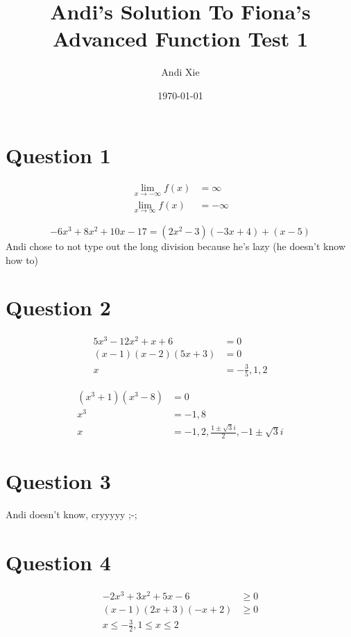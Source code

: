 \documentclass{article}
\title{Andi's Solution To Fiona's Advanced Function Test 1}
\author{Andi Xie}
\date{\today}
\begin{document}
\maketitle
\tableofcontents
\newpage


\section{Question 1}
\begin{custom-big}[Part a]
\begin{align*}
    \lim_{x\to -\infty}f(x)&=\infty\\
    \lim_{x\to \infty}f(x)&=-\infty
\end{align*}
\end{custom-big}




\begin{custom-big}[Part b]
\[
-6x^3+8x^2+10x-17=(2x^2-3)(-3x+4)+(x-5)
\]
Andi chose to not type out the long division because he's lazy (he doesn't know how to)
\end{custom-big}




\section{Question 2}
\begin{custom-big}[Part a]
\begin{align*}
5x^3-12x^2+x+6&=0\\
(x-1)(x-2)(5x+3)&=0\\
x&=-\frac 35,1,2
\end{align*}
\end{custom-big}

\begin{custom-big}[Part b]
\begin{align*}
(x^3+1)(x^3-8)&=0\\
x^3&=-1,8\\
x&=-1,2,\frac{1\pm\sqrt{3}i}{2},-1\pm\sqrt{3}i
\end{align*}
\end{custom-big}


\section{Question 3}
Andi doesn't know, cryyyyy ;-;


\section{Question 4}
\begin{custom-big}[Part a]
\begin{align*}
    -2x^3+3x^2+5x-6&\ge 0\\
    (x-1)(2x+3)(-x+2)&\ge 0\\
    x\leq -\frac 32,1\leq x\leq 2
\end{align*}
\end{custom-big}
\end{document}
